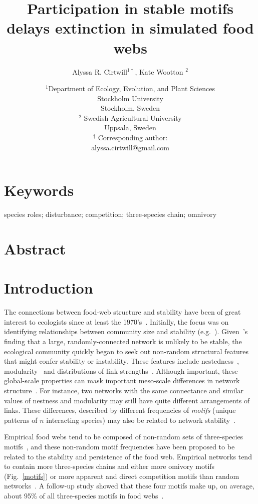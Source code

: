 \documentclass[12pt]{article}
\title{Participation in stable motifs delays extinction in simulated food webs}
\author{Alyssa R. Cirtwill$^{1\dagger}$, Kate Wootton $^{2}$}
\date{\small$^1$Department of Ecology, Evolution, and Plant Sciences\\ 
Stockholm University\\
Stockholm, Sweden\\
\medskip
\small$^2$ Swedish Agricultural University\\
Uppsala, Sweden\\
\medskip
$^\dagger$ Corresponding author:\\
alyssa.cirtwill@gmail.com\\
 }
\begin{document}
 
\maketitle 
\raggedright
\setlength{\parindent}{15pt} 


\section{Keywords}

	species roles; disturbance; competition; three-species chain; omnivory


\section{Abstract}


\section{Introduction}

	The connections between food-web structure and stability have been of great interest to ecologists since at least the 1970's~\citep{May1972}. Initially, the focus was on identifying relationships between community size and stability (e.g.~\citealp{Gardner1970,May1972}). Given~\citet{May1972}'s finding that a large, randomly-connected network is unlikely to be stable, the ecological community quickly began to seek out non-random structural features that might confer stability or instability. These features include nestedness~\citep{Allesina2012,Sauve2014}, modularity~\citep{Sauve2014,Thebault2010} and distributions of link strengths~\citep{McCann1998,Gross2009,Rooney2012,Wootton2016}. Although important, these global-scale properties can mask important meso-scale differences in network structure~\citep{Simmons2019}. For instance, two networks with the same connectance and similar values of nestness and modularity may still have quite different arrangements of links. These differences, described by different frequencies of \emph{motifs} (unique patterns of $n$ interacting species) may also be related to network stability~\citep{Prill2005,Borrelli2015,Monteiro2016}. 


	Empirical food webs tend to be composed of non-random sets of three-species motifs~\citep{Stouffer2007}, and these non-random motif frequencies have been proposed to be related to the stability and persistence of the food web. Empirical networks tend to contain more three-species chains and either more omivory motifs (Fig.~\ref{motifs}) or more apparent and direct competition motifs than random networks~\citep{Stouffer2007}. A follow-up study showed that these four motifs make up, on average, about 95\% of all three-species motifs in food webs~\citep{Stouffer2010b}. 
\end{document}
